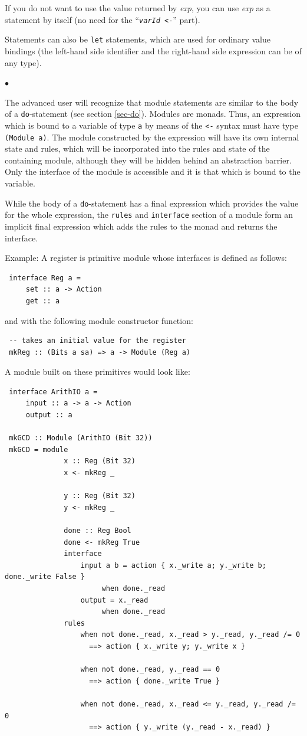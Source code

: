 \documentclass[twoside,letterpaper]{article}
\newcommand{\hm}{\hspace*{1em}}
\newenvironment{NOTE}{%
  \hm{\bf{Note}}
  \begin{list}{$\bullet$}{%
    \setlength{\topsep}{0in}
    \setlength{\partopsep}{0in}
    \setlength{\itemsep}{0in}
    \setlength{\parsep}{0in}
    \setlength{\leftmargin}{2em}
    \setlength{\rightmargin}{0in}
    \setlength{\itemindent}{0in}
  }\item[]
  \sf
 }
 {\end{list}\hm{\bf{End of Note}}}
\newcommand{\te}[1]{\texttt{#1}}
\newcommand{\nterm}[1]{\emph{#1}}
\newcommand{\qbs}[1]{``\mbox{\te{#1}}''}
\begin{document}
If you do not want to use the value returned by {\nterm{exp}}, you can
use {\nterm{exp}} as a statement by itself (no need for the
{\qbs{\nterm{varId} <-}} part).

Statements can also be \te{let} statements, which are used for
ordinary value bindings (the left-hand side identifier and the
right-hand side expression can be of any type).

\begin{NOTE}
The advanced user will recognize that module statements are similar
to the body of a \te{do}-statement (see section {\ref{sec-do}}).
Modules are monads.  Thus, an expression which is bound to a
variable of type {\te{a}} by means of the \te{<-} syntax must have
type \te{(Module a)}.  The module constructed by the expression
will have its own internal state and rules, which will be incorporated
into the rules and state of the containing module, although they
will be hidden behind an abstraction barrier.  Only the interface of
the module is accessible and it is that which is bound to the
variable.

While the body of a \te{do}-statement has a final expression which
provides the value for the whole expression, the \te{rules} and
{\te{interface}} section of a module form an implicit final
expression which adds the rules to the monad and returns the
interface.
\end{NOTE}

Example: A register is primitive module whose interfaces
is defined as follows:
\begin{verbatim}
 interface Reg a =
     set :: a -> Action
     get :: a
\end{verbatim}
and with the following module constructor function:
\begin{verbatim}
 -- takes an initial value for the register
 mkReg :: (Bits a sa) => a -> Module (Reg a)
\end{verbatim}

A module built on these primitives would look like:
\begin{verbatim}
 interface ArithIO a =
     input :: a -> a -> Action
     output :: a

 mkGCD :: Module (ArithIO (Bit 32))
 mkGCD = module
              x :: Reg (Bit 32)
              x <- mkReg _

              y :: Reg (Bit 32)
              y <- mkReg _

              done :: Reg Bool
              done <- mkReg True
              interface
                  input a b = action { x._write a; y._write b; done._write False }
                       when done._read
                  output = x._read
                       when done._read
              rules
                  when not done._read, x._read > y._read, y._read /= 0
                    ==> action { x._write y; y._write x }

                  when not done._read, y._read == 0
                    ==> action { done._write True }

                  when not done._read, x._read <= y._read, y._read /= 0
                    ==> action { y._write (y._read - x._read) }
\end{verbatim}
\end{document}
